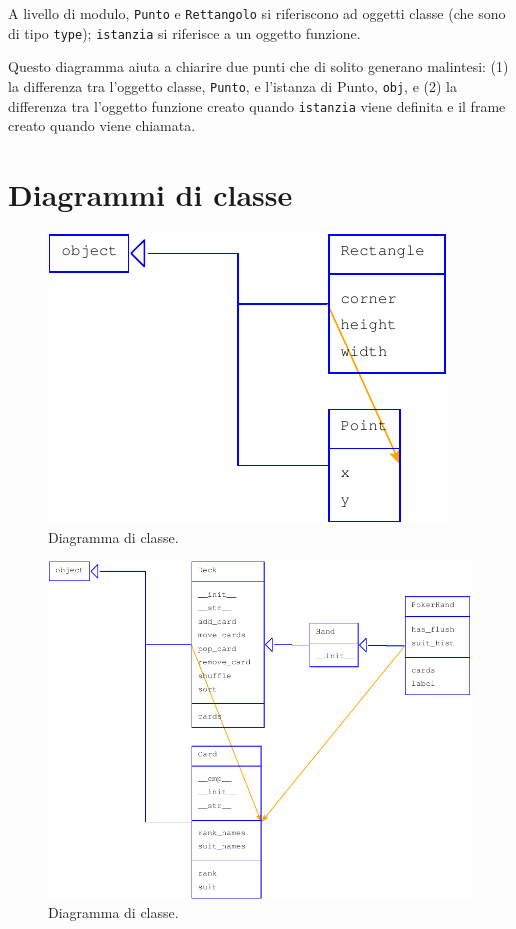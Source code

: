\documentclass[10pt]{book}
\begin{document}
A livello di modulo, {\tt Punto} e {\tt Rettangolo} si riferiscono ad oggetti classe (che sono di tipo {\tt type}); {\tt istanzia}
si riferisce a un oggetto funzione.

Questo diagramma aiuta a chiarire due punti che di solito generano malintesi: (1) la differenza tra l'oggetto classe, {\tt Punto}, e l'istanza di Punto, {\tt obj}, e (2) la differenza tra l'oggetto funzione creato quando {\tt istanzia} viene definita e il frame creato quando viene chiamata.


\section{Diagrammi di classe}

\begin{figure}
\centerline
{\includegraphics[scale=0.7]{figs/lumpydemo7.pdf}}
\caption{Diagramma di classe.}
\label{fig.lumpy7}
\end{figure}

\begin{figure}
\centerline
{\includegraphics[scale=0.7]{figs/lumpydemo8.pdf}}
\caption{Diagramma di classe.}
\label{fig.lumpy8}
\end{figure}
\end{document}
